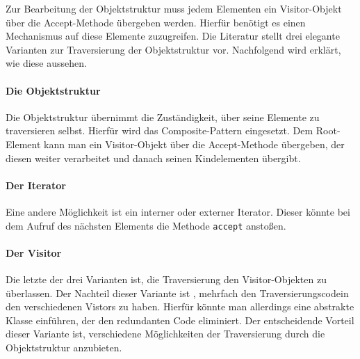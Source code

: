 Zur Bearbeitung der Objektstruktur muss jedem Elementen ein Visitor-Objekt über die Accept-Methode übergeben werden. Hierfür benötigt es einen Mechanismus auf diese Elemente zuzugreifen.
Die Literatur stellt drei elegante Varianten zur Traversierung der Objektstruktur vor. Nachfolgend wird erklärt, wie diese aussehen.
\paragraph{Die Objektstruktur} Die Objektstruktur übernimmt die Zuständigkeit, über seine Elemente zu traversieren selbst. Hierfür wird das Composite-Pattern eingesetzt. Dem Root-Element kann man ein Visitor-Objekt über die Accept-Methode übergeben, der diesen weiter verarbeitet und danach seinen Kindelementen übergibt. 
\paragraph{Der Iterator} Eine andere Möglichkeit ist ein interner oder externer Iterator. Dieser könnte bei dem Aufruf des nächsten Elements die Methode \texttt{accept} anstoßen.
\paragraph{Der Visitor} Die letzte der drei Varianten ist, die Traversierung den Visitor-Objekten zu überlassen. Der Nachteil dieser Variante ist , mehrfach den Traversierungscodein den verschiedenen Vistors zu haben. Hierfür könnte man allerdings eine abstrakte Klasse einführen, der den redundanten Code eliminiert. Der entscheidende Vorteil dieser Variante ist, verschiedene Möglichkeiten der Traversierung durch die Objektstruktur anzubieten.



